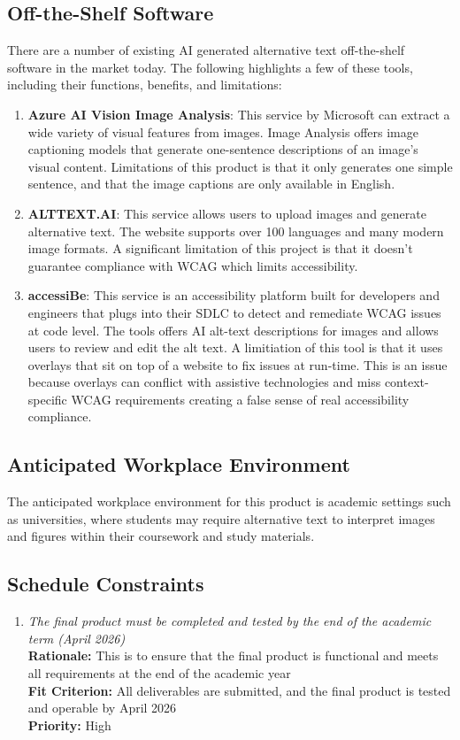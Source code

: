 \documentclass[12pt]{article}
\begin{document}
\subsection{Off-the-Shelf Software}
There are a number of existing AI generated alternative text off-the-shelf software in the market today. The following 
highlights a few of these tools, including their functions, benefits, and limitations: 
\begin{enumerate}
  \item \textbf{Azure AI Vision Image Analysis}: This service by Microsoft can extract a wide variety of 
  visual features from images. Image Analysis offers image captioning models that generate one-sentence descriptions of an image's visual content.
  Limitations of this product is that it only generates one simple sentence, and that the image
  captions are only available in English.
  \item \textbf{ALTTEXT.AI}: This service allows users to upload images and generate alternative text. The website supports
  over 100 languages and many modern image formats. A significant limitation of this project
  is that it doesn't guarantee compliance with WCAG which limits accessibility.
  \item \textbf{accessiBe}: This service is an accessibility platform built for developers and engineers that plugs into their SDLC to detect and 
  remediate WCAG issues at code level. The tools offers AI alt-text descriptions for images and allows users to review 
  and edit the alt text. A limitiation of this tool is that it uses overlays that sit on top of a website to fix issues at run-time. This is an issue 
  because overlays can conflict with assistive technologies and miss context-specific WCAG requirements creating a false sense of real accessibility compliance.
\end{enumerate}
\subsection{Anticipated Workplace Environment}
The anticipated workplace environment for this product is academic settings such as universities, where students may 
require alternative text to interpret images and figures within their coursework and study materials. 
\subsection{Schedule Constraints}
\begin{enumerate}[label=MD-SC \arabic*., wide=0pt, leftmargin=*]
  \item \emph{The final product must be completed and tested by the end of the academic term (April 2026)}\\[2mm]
    {\bf Rationale:} This is to ensure that the final product is functional and meets all requirements
    at the end of the academic year\\
    {\bf Fit Criterion:} All deliverables are submitted, and the final product is tested and operable by April 2026 \\
    {\bf Priority:} High
\end{enumerate}
\end{document}
